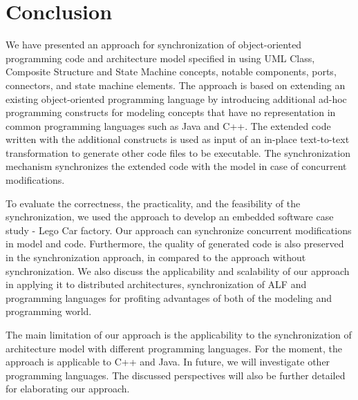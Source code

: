 \section{Conclusion}
\label{sec:conclusion}
We have presented an approach for synchronization of object-oriented programming code and architecture model specified in using UML Class, Composite Structure and State Machine concepts, notable components, ports, connectors, and state machine elements.
The approach is based on extending an existing object-oriented programming language by introducing additional ad-hoc programming constructs for modeling concepts that have no representation in common programming languages such as Java and C++.
The extended code written with the additional constructs is used as input of an in-place text-to-text transformation to generate other code files to be executable.
The synchronization mechanism synchronizes the extended code with the model in case of concurrent modifications.



  
To evaluate the correctness, the practicality, and the feasibility of the synchronization, we used the approach to develop an embedded software case study - Lego Car factory.
Our approach can synchronize concurrent modifications in model and code.
Furthermore, the quality of generated code is also preserved in the synchronization approach, in compared to the approach without synchronization.
We also discuss the applicability and scalability of our approach in applying it to distributed architectures, synchronization of ALF and programming languages for profiting advantages of both of the modeling and programming world.  

The main limitation of our approach is the applicability to the synchronization of architecture model with different programming languages.
For the moment, the approach is applicable to C++ and Java.
In future, we will investigate other programming languages. 
The discussed perspectives will also be further detailed for elaborating our approach.  


